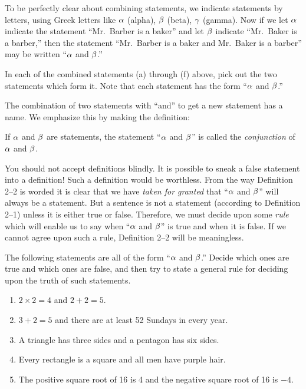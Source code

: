 \documentclass[11pt]{book}
\begin{document}
To be perfectly clear about combining statements, we indicate statements by
letters, using Greek letters like $\alpha$ (alpha), $\beta$ (beta),
$\gamma$ (gamma). Now if we let $\alpha$ indicate the statement ``Mr.\ Barber is a
baker'' and let $\beta$ indicate ``Mr.\ Baker is a barber,'' then the statement
``Mr.\ Barber is a baker and Mr.\ Baker is a barber'' may be written
``$\alpha$ and $\beta$.''

\begin{IIproblem}
In each of the combined statements (a) through (f) above, pick
out the two statements which form it. Note that each statement has the form
``$\alpha$ and $\beta$.''
\end{IIproblem}

The combination of two statements with ``and'' to get a new statement has a name.
We emphasize this by making the definition:

\begin{definition}
If $\alpha$ and $\beta$ are statements, the statement ``$\alpha$ and $\beta$'' is called the
\emph{conjunction} of $\alpha$ and $\beta$.
\end{definition}

You should not accept definitions blindly. It is possible to sneak a false
statement into a definition! Such a definition would be worthless. From the way
Definition 2--2 is worded it is clear that we have \emph{taken for granted} that
``$\alpha$ and $\beta$'' will always be a statement. But a sentence is not a statement
(according to Definition 2--1) unless it is either true or false. Therefore, we
must decide upon some \emph{rule} which will enable us to say when ``$\alpha$ and
$\beta$'' is true and when it is false. If we cannot agree upon such a rule,
Definition 2--2 will be meaningless.

The following statements are all of the form ``$\alpha$ and $\beta$.'' Decide which
ones are true and which ones are false, and then try to state a general rule for
deciding upon the truth of such statements.

\begin{enumerate}[label=(\alph*), leftmargin=2.2em, itemsep=1pt, topsep=3pt]
\item $2 \times 2 = 4$ and $2 + 2 = 5$.
\item $3 + 2 = 5$ and there are at least 52 Sundays in every year.
\item A triangle has three sides and a pentagon has six sides.
\item Every rectangle is a square and all men have purple hair.
\item The positive square root of 16 is 4 and the negative square root of 16 is
      $-4$.
\end{enumerate}
\end{document}
